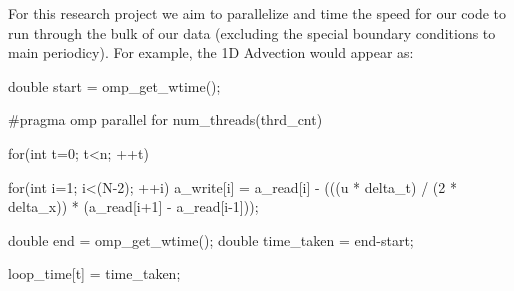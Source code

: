 \documentclass{article}
\begin{document}
For this research project we aim to parallelize and time the speed for our code to run through the bulk of our data (excluding the special boundary conditions to main periodicy). For example, the 1D Advection would appear as:

\begin{c++}
double start = omp_get_wtime();

#pragma omp parallel for num_threads(thrd_cnt)

for(int t=0; t<n; ++t)
{
	for(int i=1; i<(N-2); ++i)
   	{
   		a_write[i] = a_read[i] - 
   		(((u * delta_t) / (2 * delta_x)) 
   		* (a_read[i+1] - a_read[i-1]));
  	}

	double end = omp_get_wtime();
	double time_taken = end-start;
	
	loop_time[t] = time_taken;
}	
\end{c++}
\end{document}
